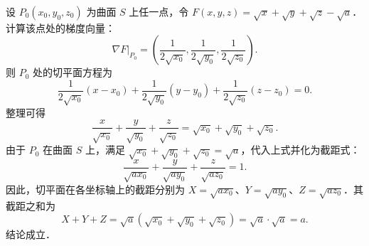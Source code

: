 \begin{solution}

    设 $P_0(x_0, y_0, z_0)$ 为曲面 $S$ 上任一点，令 $F(x, y, z) = \sqrt{x} + \sqrt{y} + \sqrt{z} - \sqrt{a}$．计算该点处的梯度向量：
    \begin{equation}
        \nabla F\big|_{P_0} = \left( \frac{1}{2\sqrt{x_0}}, \frac{1}{2\sqrt{y_0}}, \frac{1}{2\sqrt{z_0}} \right).
    \end{equation}
    则 $P_0$ 处的切平面方程为
    \begin{equation}
        \frac{1}{2\sqrt{x_0}}(x - x_0) + \frac{1}{2\sqrt{y_0}}(y - y_0) + \frac{1}{2\sqrt{z_0}}(z - z_0) = 0.
    \end{equation}
    整理可得
    \begin{equation}
        \frac{x}{\sqrt{x_0}} + \frac{y}{\sqrt{y_0}} + \frac{z}{\sqrt{z_0}} = \sqrt{x_0} + \sqrt{y_0} + \sqrt{z_0}.
    \end{equation}
    由于 $P_0$ 在曲面 $S$ 上，满足 $\sqrt{x_0} + \sqrt{y_0} + \sqrt{z_0} = \sqrt{a}$，代入上式并化为截距式：
    \begin{equation}
        \frac{x}{\sqrt{ax_0}} + \frac{y}{\sqrt{ay_0}} + \frac{z}{\sqrt{az_0}} = 1.
    \end{equation}
    因此，切平面在各坐标轴上的截距分别为 $X = \sqrt{ax_0}$、$Y = \sqrt{ay_0}$、$Z = \sqrt{az_0}$．其截距之和为
    \begin{equation}
        X + Y + Z = \sqrt{a}(\sqrt{x_0} + \sqrt{y_0} + \sqrt{z_0}) = \sqrt{a} \cdot \sqrt{a} = a.
    \end{equation}
    结论成立．



\end{solution}

